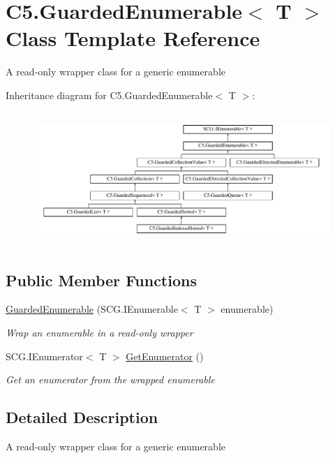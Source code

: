 \hypertarget{class_c5_1_1_guarded_enumerable}{}\section{C5.\+Guarded\+Enumerable$<$ T $>$ Class Template Reference}
\label{class_c5_1_1_guarded_enumerable}


A read-\/only wrapper class for a generic enumerable  


Inheritance diagram for C5.\+Guarded\+Enumerable$<$ T $>$\+:\begin{figure}[H]
\begin{center}
\leavevmode
\includegraphics[height=5.084306cm]{class_c5_1_1_guarded_enumerable}
\end{center}
\end{figure}
\subsection*{Public Member Functions}
\begin{DoxyCompactItemize}
\item 
\hyperlink{class_c5_1_1_guarded_enumerable_acfdc32a8f8896ca793e93a12c863f58b}{Guarded\+Enumerable} (S\+C\+G.\+I\+Enumerable$<$ T $>$ enumerable)
\begin{DoxyCompactList}\small\item\em Wrap an enumerable in a read-\/only wrapper \end{DoxyCompactList}\item 
S\+C\+G.\+I\+Enumerator$<$ T $>$ \hyperlink{class_c5_1_1_guarded_enumerable_aab3a7dc7eeb5ab3b64764333037ff119}{Get\+Enumerator} ()
\begin{DoxyCompactList}\small\item\em Get an enumerator from the wrapped enumerable \end{DoxyCompactList}\end{DoxyCompactItemize}


\subsection{Detailed Description}
A read-\/only wrapper class for a generic enumerable 

